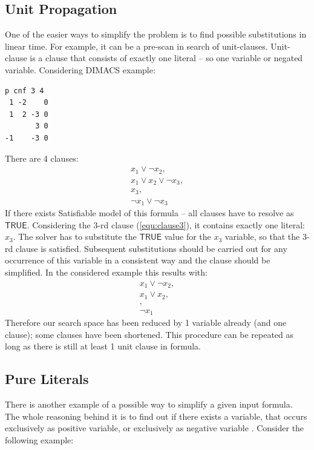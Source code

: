 \documentclass[12pt,english,pdflatex]{aghdpl}
\begin{document}
\subsection{Unit Propagation}
\label{subsec:UnitProp}

One of the easier ways to simplify the problem is to find possible
substitutions in linear time. For example, it can be a  pre-scan in search of unit-clauses.
Unit-clause is a clause that consists of exactly one literal \cite{Franco:1993} -- so one
variable or negated variable. Considering DIMACS example:

\begin{lstlisting}
p cnf 3 4
 1 -2    0
 1  2 -3 0
       3 0
-1    -3 0
\end{lstlisting}

There are 4 clauses: 
\begin{gather}
x_1 \vee \neg x_2, \\
x_1\vee x_2\vee \neg x_3, \\
x_3\label{equ:clause3}, \\
\neg x_1 \vee \neg x_3
\end{gather}
If there exists Satisfiable model of this formula -- all clauses have to resolve as $\mathsf{TRUE}$.
Considering the 3-rd clause (\ref{equ:clause3}), it contains exactly one literal: $x_3$. The solver has
to substitute the $\mathsf{TRUE}$ value for the  $x_3$ variable, so that the 3-rd clause
is satisfied. Subsequent substitutions should be carried out  for any occurrence of this variable in a consistent way and the clause should be simplified. In the considered example this results with:
\begin{gather}
x_1 \vee \neg x_2, \\
x_1\vee x_2, \\
\label{equ:clause3reduced}, \\
\neg x_1 
\end{gather}
Therefore our search space has been  reduced by 1 variable
already (and one clause); some clauses have been shortened. This procedure can be repeated as long as there is still at least 1 unit clause in formula.

\subsection{Pure Literals}
\label{subsec:Pure}

There is another example of a possible way to simplify a given input formula. The whole reasoning
behind it is to find out if there exists a variable, that occurs exclusively
as positive variable, or exclusively as negative variable \cite{Biere:2009}. Consider the
following example:
\end{document}
